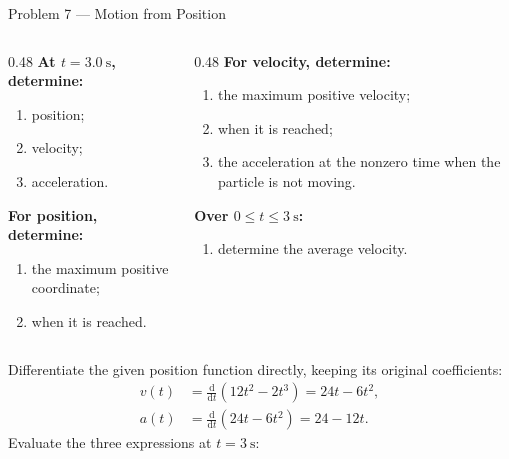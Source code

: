 \begin{frame}{Problem 7 — Motion from Position}
  \vspace{0.15em}
  \vspace{0.1em}
  \scriptsize
  \begin{columns}[T,onlytextwidth]
    \begin{column}{0.48\textwidth}
      \textbf{At $t=\SI{3.0}{\second}$, determine:}
      \begin{enumerate}
        \item[(a)] position;
        \item[(b)] velocity;
        \item[(c)] acceleration.
      \end{enumerate}
      \textbf{For position, determine:}
      \begin{enumerate}
        \item[(d)] the maximum positive coordinate;
        \item[(e)] when it is reached.
      \end{enumerate}
    \end{column}
    \begin{column}{0.48\textwidth}
      \textbf{For velocity, determine:}
      \begin{enumerate}
        \item[(f)] the maximum positive velocity;
        \item[(g)] when it is reached;
        \item[(h)] the acceleration at the nonzero time when the particle is
          not moving.
      \end{enumerate}
      \textbf{Over $0\le t\le\SI{3}{\second}$:}
      \begin{enumerate}
        \item[(i)] determine the average velocity.
      \end{enumerate}
    \end{column}
  \end{columns}
\end{frame}

\begin{solutionframe}
  \footnotesize
  Differentiate the given position function directly, keeping its original
  coefficients:
  \begin{align*}
    v(t)&=\frac{\mathrm{d}}{\mathrm{d}t}\left(12t^2-2t^3\right)
      =24t-6t^2,\\
    a(t)&=\frac{\mathrm{d}}{\mathrm{d}t}\left(24t-6t^2\right)
      =24-12t.
  \end{align*}
  Evaluate the three expressions at $t=\SI{3}{\second}$:
\end{solutionframe}

